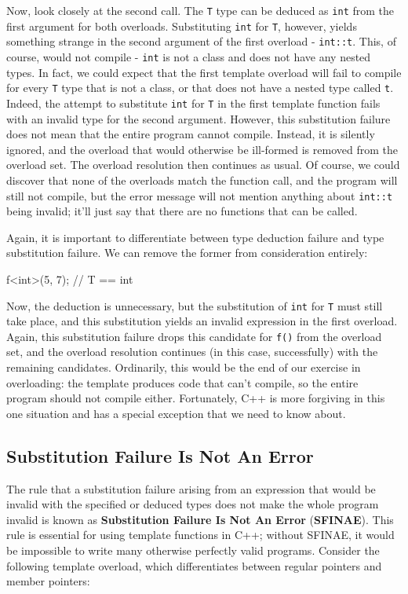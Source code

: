 Now, look closely at the second call. The \texttt{T} type can be deduced as \texttt{int} from the first argument for both overloads. Substituting \texttt{int} for \texttt{T}, however, yields something strange in the second argument of the first overload - \texttt{int::t}. This, of course, would not compile - \texttt{int} is not a class and does not have any nested types. In fact, we could expect that the first template overload will fail to compile for every \texttt{T} type that is not a class, or that does not have a nested type called \texttt{t}. Indeed, the attempt to substitute \texttt{int} for \texttt{T} in the first template function fails with an invalid type for the second argument. However, this substitution failure does not mean that the entire program cannot compile. Instead, it is silently ignored, and the overload that would otherwise be ill-formed is removed from the overload set. The overload resolution then continues as usual. Of course, we could discover that none of the overloads match the function call, and the program will still not compile, but the error message will not mention anything about \texttt{int::t} being invalid; it'll just say that there are no functions that can be called.

Again, it is important to differentiate between type deduction failure and type substitution failure. We can remove the former from consideration entirely:

\begin{code}
f<int>(5, 7);    // T == int
\end{code}

Now, the deduction is unnecessary, but the substitution of \texttt{int} for \texttt{T} must still take place, and this substitution yields an invalid expression in the first overload. Again, this substitution failure drops this candidate for \texttt{f()} from the overload set, and the overload resolution continues (in this case, successfully) with the remaining candidates. Ordinarily, this would be the end of our exercise in overloading: the template produces code that can't compile, so the entire program should not compile either. Fortunately, C++ is more forgiving in this one situation and has a special exception that we need to know about.

\subsection{Substitution Failure Is Not An Error}

The rule that a substitution failure arising from an expression that would be invalid with the specified or deduced types does not make the whole program invalid is known as \textbf{Substitution Failure Is Not An Error} (\textbf{SFINAE}). This rule is essential for using template functions in C++; without SFINAE, it would be impossible to write many otherwise perfectly valid programs. Consider the following template overload, which differentiates between regular pointers and member pointers:

